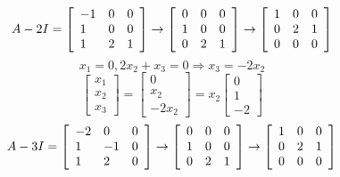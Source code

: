 \documentclass[12pt,letterpaper,reqno]{amsart}
\begin{document}
\begin{enumerate}
\begin{enumerate}
\begin{flushleft}
    \newline
    $$A-2I = \left[ \begin{array} { l l l } { -1 } & { 0 } & { 0 } \\ { 1 } & { 0 } & { 0 } \\ { 1 } & { 2 } & { 1 } \end{array} \right] \rightarrow \left[ \begin{array} { l l l } { 0 } & { 0 } & { 0 } \\ { 1 } & { 0 } & { 0 } \\ { 0 } & { 2 } & { 1 } \end{array} \right] \rightarrow \left[ \begin{array} { l l l } { 1 } & { 0 } & { 0 } \\ { 0 } & { 2 } & { 1 } \\ { 0 } & { 0 } & { 0 } \end{array} \right]$$
    $$x_1 = 0, 2x_2 + x_3 = 0 \Rightarrow x_3 = -2x_2$$
    $$\left[ \begin{array} { l } { x_1 } \\ { x_2 } \\ { x_3 } \end{array} \right] = \left[ \begin{array} { l } { 0 } \\ { x_2 } \\ { -2x_2 } \end{array} \right] = x_2 \left[ \begin{array} { l } { 0 } \\ { 1 } \\ { -2 } \end{array} \right]$$
    \newline
    $$A-3I = \left[ \begin{array} { l l l } { -2 } & { 0 } & { 0 } \\ { 1 } & { -1 } & { 0 } \\ { 1 } & { 2 } & { 0 } \end{array} \right] \rightarrow \left[ \begin{array} { l l l } { 0 } & { 0 } & { 0 } \\ { 1 } & { 0 } & { 0 } \\ { 0 } & { 2 } & { 1 } \end{array} \right] \rightarrow \left[ \begin{array} { l l l } { 1 } & { 0 } & { 0 } \\ { 0 } & { 2 } & { 1 } \\ { 0 } & { 0 } & { 0 } \end{array} \right]$$

\end{flushleft}
\end{enumerate}
\end{enumerate}
\end{document}

